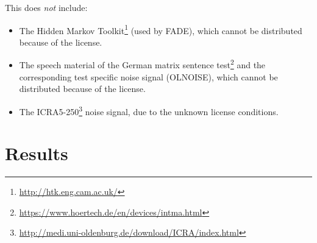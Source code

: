 \documentclass[10pt,a4paper,twocolumn]{article}
\begin{document}
This does \emph{not} include:
\begin{itemize}
	\item The Hidden Markov Toolkit\footnote{\url{http://htk.eng.cam.ac.uk/}} (used by FADE), which cannot be distributed because of the license.
	\item The speech material of the German matrix sentence test\footnote{\url{https://www.hoertech.de/en/devices/intma.html}} and the corresponding test specific noise signal (OLNOISE), which cannot be distributed because of the license.
	\item The ICRA5-250\footnote{\url{http://medi.uni-oldenburg.de/download/ICRA/index.html}} noise signal, due to the unknown license conditions.
\end{itemize}


\section*{Results}
\label{sec:results}
%
\end{document}
